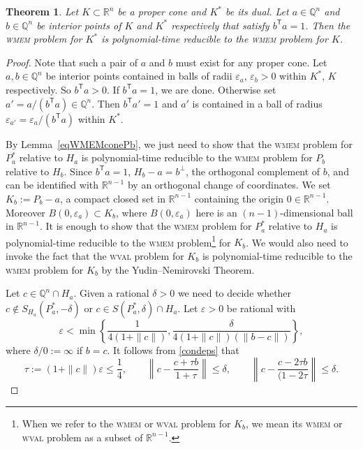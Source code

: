 \documentclass[11pt,reqno]{amsart}
\newtheorem{theorem}{Theorem}[section]
\theoremstyle{definition}
\theoremstyle{remark}
\begin{document}
\begin{theorem}\label{WMEMcone}
Let $K\subset \mathbb{R}^n$ be a proper cone and $K^*$ be its dual.  Let $a \in \mathbb{Q}^n$ and $b\in\mathbb{Q}^n$ be  interior points of $K$ and $K^*$ respectively that satisfy $b^\mathsf{T} a=1$.  Then the \textsc{wmem} problem for $K^*$ is polynomial-time reducible to the \textsc{wmem} problem for $K$.
\end{theorem}
\begin{proof} 
Note that such a pair of $a$ and $b$ must exist for any proper cone. Let $a,b\in \mathbb{Q}^n$ be interior points contained in balls of radii $\varepsilon_a$, $\varepsilon_b >0$ within $K^*$, $K$
respectively. So $b^\mathsf{T} a > 0$.  If $b^\mathsf{T} a=1$, we are done. Otherwise set $a' = a/(b^\mathsf{T} a)\in \mathbb{Q}^n$.  Then $b^\mathsf{T}a'=1$ and $a'$ is contained in a ball of radius
$\varepsilon_{a'}=\varepsilon_a/(b^\mathsf{T}a)$ within $K^*$.

By Lemma~\ref{eqWMEMconePb}, we just need to show that the \textsc{wmem} problem for $P_a^*$ relative to $H_a$ is polynomial-time reducible to the \textsc{wmem} problem for $P_b$ relative to $H_b$. Since $b^\mathsf{T} a=1$, $H_b -a =b^{\perp}$, the orthogonal complement of $b$, and can be identified with $\mathbb{R}^{n-1}$ by an orthogonal change of coordinates.  We set $K_b:= P_b-a$, a compact closed set in $\mathbb{R}^{n-1}$ containing the origin $0\in \mathbb{R}^{n-1}$.  Moreover $B(0,\varepsilon_a)\subset K_b$, where $B(0,\varepsilon_a)$ here is an $(n-1)$-dimensional ball in $\mathbb{R}^{n-1}$. It is enough to show that the \textsc{wmem} problem for $P_a^*$ relative to $H_a$ is polynomial-time reducible to the \textsc{wmem} problem\footnote{When we refer to the \textsc{wmem} or \textsc{wval} problem for $K_b$, we mean its \textsc{wmem} or \textsc{wval} problem as a subset of $\mathbb{R}^{n-1}$.} for $K_b$. We would also need to invoke the fact that the \textsc{wval} problem for $K_b$ is polynomial-time reducible to the \textsc{wmem} problem for $K_b$ by the Yudin--Nemirovski Theorem.

Let $c\in \mathbb{Q}^n\cap H_a$.  Given a rational $\delta>0$ we need to decide whether $c\notin S_{H_a}(P_a^*,-\delta)$ or $c\in S(P_a^*,\delta)\cap H_a$.  Let $\varepsilon>0$ be rational with
\begin{equation}\label{condeps}
\varepsilon <\min\left\{\frac{1}{4(1+\|c\|)}, \frac{\delta}{4(1+\|c\|)(\|b-c\|)} \right\},
\end{equation}
where $\delta/0 :=\infty$ if $b = c$.  It follows from \eqref{condeps} that
\begin{equation}\label{condeps1}
\tau:=(1+\|c\|)\varepsilon\le \frac{1}{4},\qquad \left\|c-\frac{c+\tau b}{1+\tau}\right\| \le \delta,\qquad \left\|c - \frac{c-2\tau b}{(1-2\tau}\right\|\le \delta.
\end{equation}


\end{proof}
\end{document}

